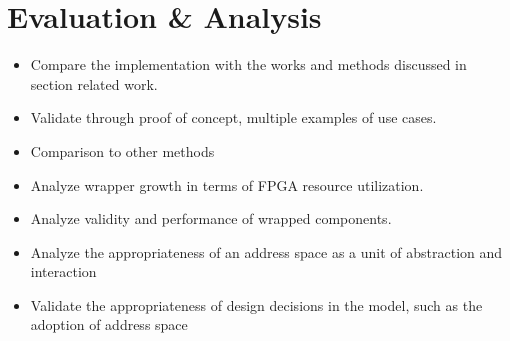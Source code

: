 \documentclass[main.tex]{subfiles}
\begin{document}
\chapter{Evaluation \& Analysis}

\begin{itemize}
    \item Compare the implementation with the works and methods discussed in section related work.
    \item Validate through proof of concept, multiple examples of use cases.
    \item Comparison to other methods
    \item Analyze wrapper growth in terms of FPGA resource utilization.
    \item Analyze validity and performance of wrapped components.
    \item Analyze the appropriateness of an address space as a unit of abstraction and interaction
    \item Validate the appropriateness of design decisions in the model, such as the adoption of address space
    
\end{itemize}
\end{document}
